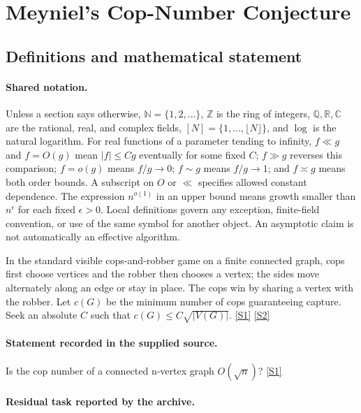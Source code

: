 \documentclass[11pt,a4paper]{article}
\newcommand{\N}{\mathbb{N}}
\newcommand{\Z}{\mathbb{Z}}
\newcommand{\Q}{\mathbb{Q}}
\newcommand{\R}{\mathbb{R}}
\newcommand{\C}{\mathbb{C}}
\newcommand{\sref}[2]{\hyperlink{source:#1:#2}{[S#2]}}
\begin{document}
\section{Meyniel’s Cop-Number Conjecture}\label{statement}


\subsection{Definitions and mathematical statement}

\paragraph{Shared notation.}Unless a section says otherwise, $\N=\{1,2,\ldots\}$,
$\Z$ is the ring of integers, $\Q,\R,\C$ are the rational, real, and complex
fields, $[N]=\{1,\ldots,\lfloor N\rfloor\}$, and $\log$ is the natural
logarithm. For real functions of a parameter tending to infinity,
$f\ll g$ and $f=O(g)$ mean $|f|\leq Cg$ eventually for some fixed $C$;
$f\gg g$ reverses this comparison; $f=o(g)$ means $f/g\to0$;
$f\sim g$ means $f/g\to1$; and $f\asymp g$ means both order bounds.
A subscript on $O$ or $\ll$ specifies allowed constant dependence.
The expression $n^{o(1)}$ in an upper bound means growth smaller than
$n^\epsilon$ for each fixed $\epsilon>0$. Local definitions govern any
exception, finite-field convention, or use of the same symbol for another
object. An asymptotic claim is not automatically an effective algorithm.



In the standard visible cops-and-robber game on a finite connected graph, cops first choose vertices and the robber then chooses a vertex; the sides move alternately along an edge or stay in place. The cops win by sharing a vertex with the robber. Let $c(G)$ be the minimum number of cops guaranteeing capture. Seek an absolute $C$ such that $c(G)\leq C\sqrt{|V(G)|}$. \sref{statement}{1} \sref{statement}{2}

\paragraph{Statement recorded in the supplied source.}
Is the cop number of a connected n-vertex graph $O(\sqrt{n})$? \sref{statement}{1}

\paragraph{Residual task reported by the archive.}
\end{document}

